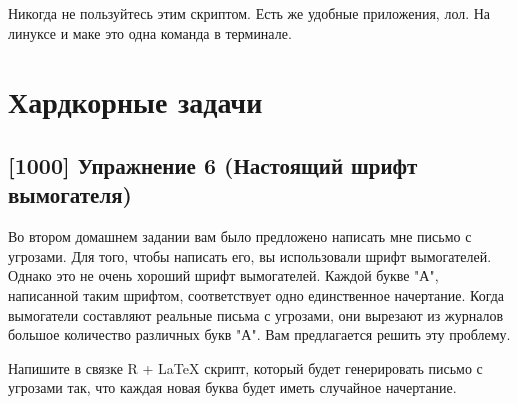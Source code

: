 \documentclass[12pt, a4paper, oneside]{article}
\begin{document}
Никогда не пользуйтесь этим скриптом. Есть же удобные приложения, лол. На линуксе и маке это одна команда в терминале.

\section*{Хардкорные задачи}

\subsection*{[1000] Упражнение 6 (Настоящий шрифт вымогателя)}

Во втором домашнем задании вам было предложено написать мне письмо с угрозами. Для того, чтобы написать его, вы использовали шрифт вымогателей. Однако это не очень хороший шрифт вымогателей. Каждой букве "А", написанной таким шрифтом, соответствует одно единственное начертание. Когда вымогатели составляют реальные письма с угрозами, они вырезают из журналов большое количество различных букв "А". Вам предлагается решить эту проблему.

Напишите в связке R + \LaTeX{} скрипт, который будет генерировать письмо с угрозами так, что каждая новая буква будет иметь случайное начертание.
\end{document}
